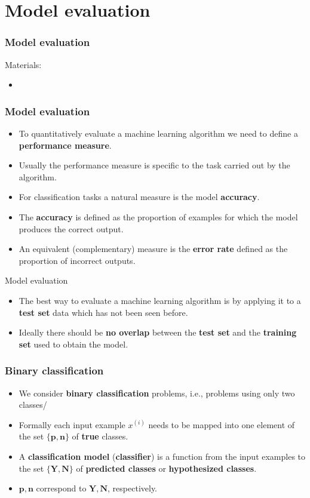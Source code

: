 \documentclass[notes]{beamer}          %
\newcommand{\vect}[1]{\bm{#1}}
\begin{document}
\section{Model evaluation}

\begin{frame}
\frametitle{Model evaluation}
Materials:
\begin{itemize}
    \item \cite{ROC}
\end{itemize}
\end{frame}


\begin{frame}
\frametitle{Model evaluation}
    \begin{itemize}
        \item To quantitatively evaluate a machine learning algorithm we need to define a {\bf performance measure}.
        \item Usually the performance measure is specific to the task carried out by the algorithm.
        \item For classification tasks a natural measure is the model {\bf accuracy}.
        \item The {\bf accuracy} is defined as the proportion of examples for which the model produces the correct output.
        \item An equivalent (complementary) measure is the {\bf error rate} defined as the proportion of incorrect outputs.
    \end{itemize}
\end{frame}

\begin{frame}{Model evaluation}
    \begin{itemize}
        \item The best way to evaluate a machine learning algorithm is by applying it to a {\bf test set} data which has not been seen before.
        \item Ideally there should be {\bf no overlap} between the {\bf test set} and  the {\bf training set} used to obtain the model.
    \end{itemize}
\end{frame}

\begin{frame}\frametitle{Binary classification}
    \begin{itemize}
        \item We consider {\bf binary classification} problems, i.e., problems using only two classes/
        \item Formally each input example $x^{(i)}$ needs to be mapped into one element of the set $\{\vect{p},\vect{n}\}$ of {\bf true} classes.
        \item A {\bf classification model} ({\bf classifier}) is a function from the input examples to the set $\{\vect{Y}, \vect{N}\}$ of {\bf predicted classes} or {\bf hypothesized classes}.
        \item $\vect{p},\vect{n}$ correspond to $\vect{Y},\vect{N}$, respectively.
    \end{itemize}
\end{frame}
\end{document}
